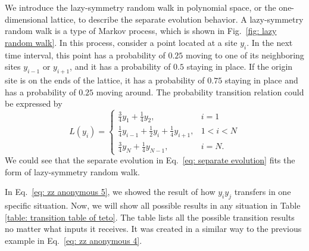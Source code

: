\documentclass{article}
\begin{document}
We introduce the lazy-symmetry random walk in polynomial space, or the one-dimensional lattice, to describe the separate evolution behavior. A lazy-symmetry random walk is a type of Markov process, which is shown in Fig.~\ref{fig: lazy random walk}. In this process, consider a point located at a site $y_i$. In the next time interval, this point has a probability of $0.25$  moving to one of its neighboring sites $y_{i-1}$ or $y_{i+1}$, and it has a probability of $0.5$ staying in place. If the origin site is on the ends of the lattice, it has a probability of $0.75$ staying in place and has a probability of $0.25$ moving around. The probability transition relation could be expressed by 
\begin{equation}
\label{eq: lazy random walk L}
L\left(y_i\right)=
\begin{cases}
\frac{3}{4} y_1+\frac{1}{4} y_2, &i=1 \\
\frac{1}{4} y_{i-1}+\frac{1}{2} y_i+\frac{1}{4} y_{i+1}, &1<i<N \\
\frac{3}{4} y_N+\frac{1}{4} y_{N-1}, &i=N. 
\end{cases}
\end{equation}
We could see that the separate evolution in Eq.~\eqref{eq: separate evolution} fits the form of lazy-symmetry random walk. 



In Eq.~\eqref{eq: zz anonymous 5}, we showed the result of how $y_iy_j$ transfers in one specific situation. Now, we will show all possible results in any situation in Table \ref{table: transition table of teto}. The table lists all the possible transition results no matter what inputs it receives. 
It was created in a similar way to the previous example in Eq.~\eqref{eq: zz anonymous 4}. 
\end{document}
